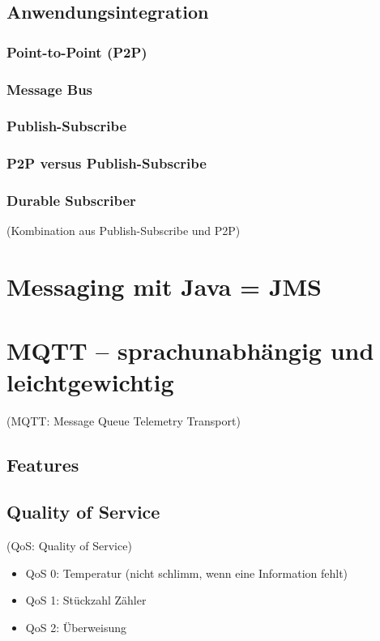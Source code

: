 \subsection{Anwendungsintegration}

\subsubsection{Point-to-Point (P2P)}

\subsubsection{Message Bus}

\subsubsection{Publish-Subscribe}

\subsubsection{P2P versus Publish-Subscribe}

\subsubsection{Durable Subscriber}
(Kombination aus Publish-Subscribe und P2P)

\section{Messaging mit Java = JMS}

\section{MQTT -- sprachunabhängig und leichtgewichtig}
(MQTT: Message Queue Telemetry Transport)
\subsection{Features}
\subsection{Quality of Service}
(QoS: Quality of Service)
\begin{itemize}
\item QoS 0: Temperatur (nicht schlimm, wenn eine Information fehlt)
\item QoS 1: Stückzahl Zähler
\item QoS 2: Überweisung
\end{itemize}

